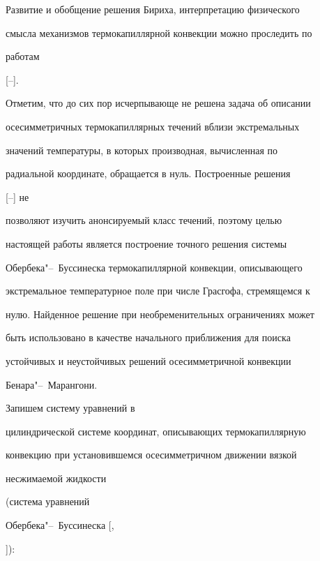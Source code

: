 Развитие и обобщение решения Бириха, интерпретацию физического

смысла механизмов термокапиллярной конвекции можно проследить по

работам

[--].

Отметим, что до сих пор исчерпывающе не решена задача об описании

осесимметричных термокапиллярных течений вблизи экстремальных

значений температуры, в которых производная, вычисленная по

радиальной координате, обращается в нуль. Построенные решения

[--] не

позволяют изучить анонсируемый класс течений, поэтому целью

настоящей работы является построение точного решения системы

Обербека"--~Буссинеска термокапиллярной конвекции, описывающего

экстремальное температурное поле при числе Грасгофа, стремящемся к

нулю. Найденное решение при необременительных ограничениях может

быть использовано в качестве начального приближения для поиска

устойчивых и неустойчивых решений осесимметричной конвекции

Бенара"--~Марангони.



\smallskip



 Запишем систему уравнений в

цилиндрической системе координат, описывающих термокапиллярную

конвекцию при установившемся осесимметричном движении вязкой

несжимаемой жидкости %

(система уравнений

Обербека"--~Буссинеска [,

]):

